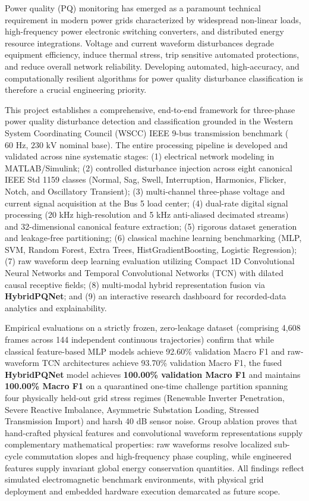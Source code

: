\documentclass[12pt,a4paper]{report}
\begin{document}
\justify
Power quality (PQ) monitoring has emerged as a paramount technical requirement in modern power grids characterized by widespread non-linear loads, high-frequency power electronic switching converters, and distributed energy resource integrations. Voltage and current waveform disturbances degrade equipment efficiency, induce thermal stress, trip sensitive automated protections, and reduce overall network reliability. Developing automated, high-accuracy, and computationally resilient algorithms for power quality disturbance classification is therefore a crucial engineering priority.

This project establishes a comprehensive, end-to-end framework for three-phase power quality disturbance detection and classification grounded in the Western System Coordinating Council (WSCC) IEEE 9-bus transmission benchmark ($60\text{ Hz}$, $230\text{ kV}$ nominal base). The entire processing pipeline is developed and validated across nine systematic stages:
(1) electrical network modeling in MATLAB/Simulink;
(2) controlled disturbance injection across eight canonical IEEE Std 1159 classes (Normal, Sag, Swell, Interruption, Harmonics, Flicker, Notch, and Oscillatory Transient);
(3) multi-channel three-phase voltage and current signal acquisition at the Bus 5 load center;
(4) dual-rate digital signal processing (20 kHz high-resolution and 5 kHz anti-aliased decimated streams) and 32-dimensional canonical feature extraction;
(5) rigorous dataset generation and leakage-free partitioning;
(6) classical machine learning benchmarking (MLP, SVM, Random Forest, Extra Trees, HistGradientBoosting, Logistic Regression);
(7) raw waveform deep learning evaluation utilizing Compact 1D Convolutional Neural Networks and Temporal Convolutional Networks (TCN) with dilated causal receptive fields;
(8) multi-modal hybrid representation fusion via \textbf{HybridPQNet}; and
(9) an interactive research dashboard for recorded-data analytics and explainability.

Empirical evaluations on a strictly frozen, zero-leakage dataset (comprising 4,608 frames across 144 independent continuous trajectories) confirm that while classical feature-based MLP models achieve 92.60\% validation Macro F1 and raw-waveform TCN architectures achieve 93.70\% validation Macro F1, the fused \textbf{HybridPQNet} model achieves \textbf{100.00\% validation Macro F1} and maintains \textbf{100.00\% Macro F1} on a quarantined one-time challenge partition spanning four physically held-out grid stress regimes (Renewable Inverter Penetration, Severe Reactive Imbalance, Asymmetric Substation Loading, Stressed Transmission Import) and harsh 40 dB sensor noise. Group ablation proves that hand-crafted physical features and convolutional waveform representations supply complementary mathematical properties: raw waveforms resolve localized sub-cycle commutation slopes and high-frequency phase coupling, while engineered features supply invariant global energy conservation quantities. All findings reflect simulated electromagnetic benchmark environments, with physical grid deployment and embedded hardware execution demarcated as future scope.
\end{document}

